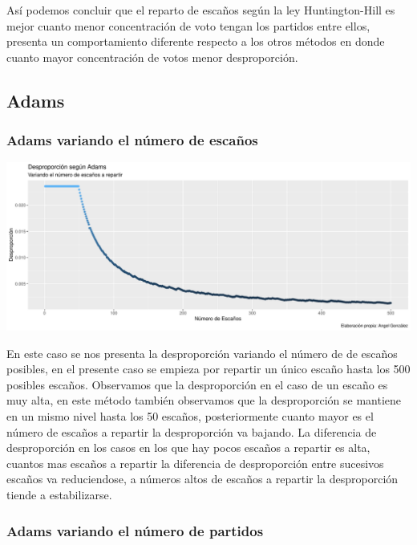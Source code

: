 \documentclass[12pt,a4paper,]{book}
\numberwithin{dummy}{section}
\theoremstyle{ocrenumbox}
\theoremstyle{blacknumex}
\theoremstyle{blacknumbox}
\theoremstyle{ocrenum}
\theoremstyle{ocrenum}
\begin{document}
Así podemos concluir que el reparto de escaños según la ley
Huntington-Hill es mejor cuanto menor concentración de voto tengan los
partidos entre ellos, presenta un comportamiento diferente respecto a
los otros métodos en donde cuanto mayor concentración de votos menor
desproporción.

\hypertarget{adams}{%
\subsection{Adams}\label{adams}}

\hypertarget{adams-variando-el-nuxfamero-de-escauxf1os}{%
\subsubsection{Adams variando el número de
escaños}\label{adams-variando-el-nuxfamero-de-escauxf1os}}

\begin{center}\includegraphics[width=0.95\linewidth]{figurasR/unnamed-chunk-34-1} \end{center}

En este caso se nos presenta la desproporción variando el número de de
escaños posibles, en el presente caso se empieza por repartir un único
escaño hasta los 500 posibles escaños. Observamos que la desproporción
en el caso de un escaño es muy alta, en este método también observamos
que la desproporción se mantiene en un mismo nivel hasta los 50 escaños,
posteriormente cuanto mayor es el número de escaños a repartir la
desproporción va bajando. La diferencia de desproporción en los casos en
los que hay pocos escaños a repartir es alta, cuantos mas escaños a
repartir la diferencia de desproporción entre sucesivos escaños va
reduciendose, a números altos de escaños a repartir la desproporción
tiende a estabilizarse.

\hypertarget{adams-variando-el-nuxfamero-de-partidos}{%
\subsubsection{Adams variando el número de
partidos}\label{adams-variando-el-nuxfamero-de-partidos}}
\end{document}
